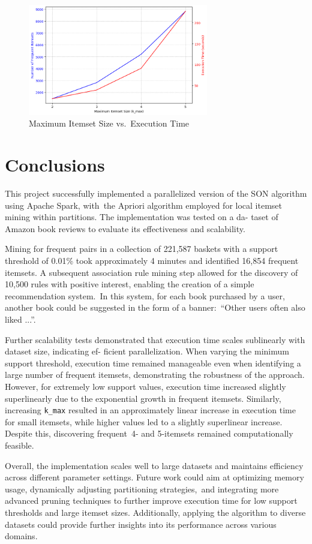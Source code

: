 \documentclass{Class/julia}
\begin{document}
\begin{figure}[!ht]
    \centering
    \includegraphics[width=0.7\textwidth]{k_max_vs_execution_time.png}
    \caption{Maximum Itemset Size vs.\ Execution Time}
    \label{fig:k_max_vs_execution_time}
\end{figure}

\section{Conclusions}\label{sec:5}

This project successfully implemented a parallelized version of the SON algorithm using Apache Spark, with~the Apriori algorithm employed for local itemset mining within partitions. The implementation was tested on a da- taset of Amazon book reviews to evaluate its effectiveness and scalability.

Mining for frequent pairs in a collection of 221,587 baskets with a support threshold of 0.01\% took approximately 4 minutes and identified 16,854 frequent itemsets. A subsequent association rule mining step allowed for the discovery of 10,500 rules with positive interest, enabling the creation of a simple recommendation system.~In this system, for each book purchased by a user, another book could be suggested in the form of a banner:\ ``Other users often also liked ...''.

Further scalability tests demonstrated that execution time scales sublinearly with dataset size, indicating ef- ficient parallelization. When varying the minimum support threshold, execution time remained manageable even when identifying a large number of frequent itemsets, demonstrating the robustness of the approach. However, for extremely low support values, execution time increased slightly superlinearly due to the exponential growth in frequent itemsets. Similarly, increasing \texttt{k\_max} resulted in an approximately linear increase in execution time for small itemsets, while higher values led to a slightly superlinear increase. Despite this, discovering frequent~4- and 5-itemsets remained computationally feasible.

Overall, the implementation scales well to large datasets and maintains efficiency across different parameter settings. Future work could aim at optimizing memory usage, dynamically adjusting partitioning strategies,~and integrating more advanced pruning techniques to further improve execution time for low support thresholds and large itemset sizes. Additionally, applying the algorithm to diverse datasets could provide further insights into its performance across various domains.

\end{document}
